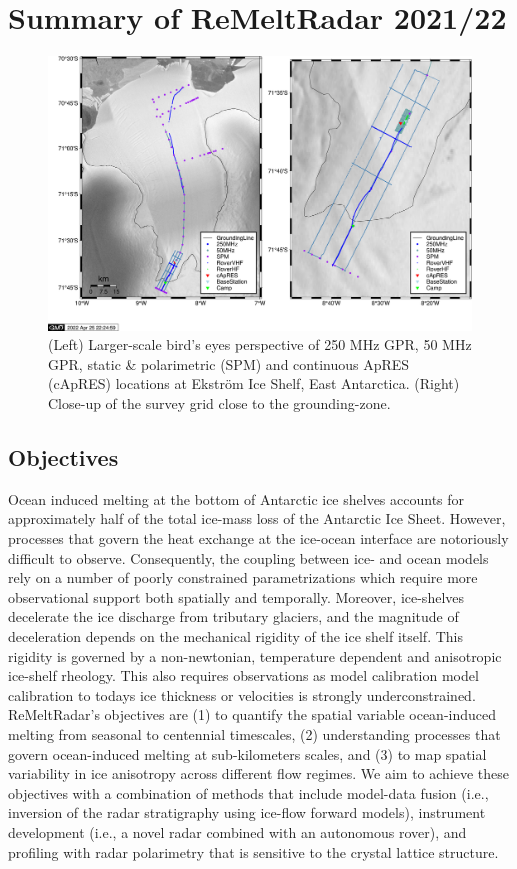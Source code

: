\documentclass[a4paper,12pt]{article}
\begin{document}
\section{Summary of ReMeltRadar 2021/22}
\begin{figure}
  \includegraphics[width=\linewidth]{Figures/Overview.png}
  \caption{(Left) Larger-scale bird's eyes perspective of 250 MHz GPR, 50 MHz GPR, static \& polarimetric (SPM) and continuous ApRES (cApRES) locations at Ekström Ice Shelf, East Antarctica. (Right) Close-up of the survey grid close to the grounding-zone.}
  \label{fig:overview}
\end{figure}
\subsection{Objectives}
Ocean induced melting at the bottom of Antarctic ice shelves accounts for approximately half of the total ice-mass loss of the Antarctic Ice Sheet. However, processes that govern the heat exchange at the ice-ocean interface are notoriously difficult to observe. Consequently, the coupling between ice- and ocean models rely on a number of poorly constrained parametrizations which require more observational support both spatially and temporally. Moreover, ice-shelves decelerate the ice discharge from tributary glaciers, and the magnitude of deceleration depends on the mechanical rigidity of the ice shelf itself. This rigidity is governed by a non-newtonian, temperature dependent and anisotropic ice-shelf rheology. This also requires observations as model calibration model calibration to todays ice thickness or velocities is strongly underconstrained.
ReMeltRadar's objectives are (1) to quantify the spatial variable ocean-induced melting from seasonal to centennial timescales, (2) understanding processes that govern ocean-induced melting at sub-kilometers scales, and (3) to map spatial variability in ice anisotropy across different flow regimes. We aim to achieve these objectives with a combination of methods that include model-data fusion (i.e., inversion of the radar stratigraphy using ice-flow forward models), instrument development (i.e., a novel radar combined with an autonomous rover), and profiling with radar polarimetry that is sensitive to the crystal lattice structure.
\end{document}
